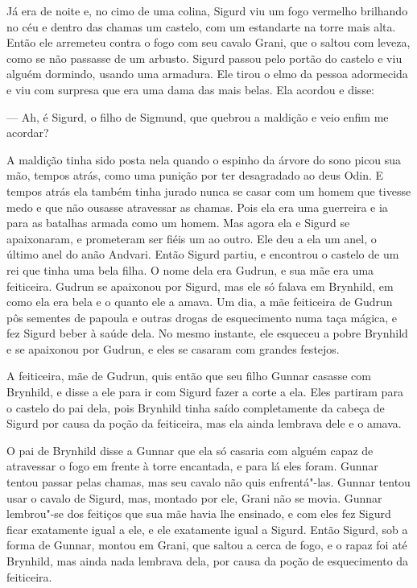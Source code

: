Já era de noite e, no cimo de uma colina, Sigurd viu um fogo 
vermelho brilhando no céu e dentro das chamas um castelo, com um estandarte na
torre mais alta. Então ele arremeteu contra o fogo com seu cavalo Grani,
que o saltou com leveza, como se não passasse de um arbusto. Sigurd
passou pelo portão do castelo e viu alguém dormindo, usando uma
armadura. Ele tirou o elmo da pessoa adormecida e viu com surpresa
que era uma dama das mais belas. Ela acordou e disse:

--- Ah, é Sigurd, o filho de Sigmund, que quebrou a maldição e veio
enfim me acordar?

A maldição tinha sido posta nela quando o espinho da árvore do sono
picou sua mão, tempos atrás, como uma punição por ter desagradado ao
deus Odin. E tempos atrás ela também tinha jurado nunca se casar com um
homem que tivesse medo e que não ousasse atravessar as chamas.
Pois ela era uma guerreira e ia para as batalhas armada como um
homem. Mas agora ela e Sigurd se apaixonaram, e prometeram ser fiéis
um ao outro. Ele deu a ela um anel, o último anel do anão
Andvari. Então Sigurd partiu, e encontrou o castelo de um rei que
tinha uma bela filha. O nome dela era Gudrun, e sua mãe era uma
feiticeira. Gudrun se apaixonou por Sigurd, mas ele só falava em
Brynhild, em como ela era bela e o quanto ele a amava. Um dia, a
mãe feiticeira de Gudrun pôs sementes de papoula e outras drogas de
esquecimento numa taça mágica, e fez Sigurd beber à saúde dela. No
mesmo instante, ele esqueceu a pobre Brynhild e se apaixonou por
Gudrun, e eles se casaram com grandes festejos.

A feiticeira, mãe de Gudrun, quis então que seu filho Gunnar casasse
com Brynhild, e disse a ele para ir com Sigurd fazer a corte a ela.
Eles partiram para o castelo do pai dela, pois Brynhild tinha saído
completamente da cabeça de Sigurd por causa da poção da feiticeira,
mas ela ainda lembrava dele e o amava. 

O pai de Brynhild disse a
Gunnar que ela só casaria com alguém capaz de atravessar o fogo em
frente à torre encantada, e para lá eles foram. Gunnar tentou
passar pelas chamas, mas seu cavalo não quis enfrentá"-las.
Gunnar tentou usar o cavalo de Sigurd, mas, montado por ele, Grani não
se movia. Gunnar lembrou"-se dos feitiços que sua mãe havia lhe
ensinado, e com eles fez Sigurd ficar exatamente igual a ele, e ele
exatamente igual a Sigurd. Então Sigurd, sob a forma de Gunnar,
montou em Grani, que saltou a cerca de fogo, e o rapaz foi até
Brynhild, mas ainda nada lembrava dela, por causa da poção de
esquecimento da feiticeira.

